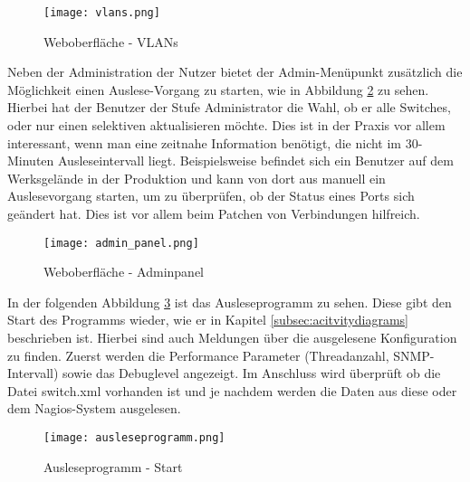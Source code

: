 \begin{figure}[H]
\centering
\texttt{[image: vlans.png]}
\caption[]{Weboberfläche - VLANs}
\label{fig:vlans}
\end{figure}

Neben der Administration der Nutzer bietet der Admin-Menüpunkt zusätzlich die Möglichkeit einen Auslese-Vorgang zu starten, wie in Abbildung \ref{fig:adminpanel} zu sehen.
Hierbei hat der Benutzer der Stufe Administrator die Wahl, ob er alle Switches, oder nur einen selektiven aktualisieren möchte.
Dies ist in der Praxis vor allem interessant, wenn man eine zeitnahe Information benötigt, die nicht im 30-Minuten Ausleseintervall liegt.
Beispielsweise befindet sich ein Benutzer auf dem Werksgelände in der Produktion und kann von dort aus manuell ein Auslesevorgang starten, um zu überprüfen, ob der Status eines Ports sich geändert hat.
Dies ist vor allem beim Patchen von Verbindungen hilfreich.

\begin{figure}[H]
\centering
\texttt{[image: admin\_panel.png]}
\caption[]{Weboberfläche - Adminpanel}
\label{fig:adminpanel}
\end{figure}

In der folgenden Abbildung \ref{fig:ausleseprogramm} ist das Ausleseprogramm zu sehen.
Diese gibt den Start des Programms wieder, wie er in Kapitel \ref{subsec:acitvitydiagrams} beschrieben ist.
Hierbei sind auch Meldungen über die ausgelesene Konfiguration zu finden.
Zuerst werden die Performance Parameter (Threadanzahl, SNMP-Intervall) sowie das Debuglevel angezeigt.
Im Anschluss wird überprüft ob die Datei switch.xml vorhanden ist und je nachdem werden die Daten aus diese oder dem Nagios-System ausgelesen.

\begin{figure}[H]
\centering
\texttt{[image: ausleseprogramm.png]}
\caption[]{Ausleseprogramm - Start}
\label{fig:ausleseprogramm}
\end{figure}








